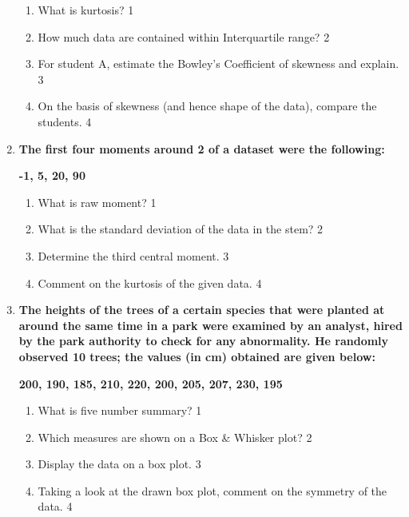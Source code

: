 \documentclass[a4paper,oneside]{book}
\begin{document}
\begin{enumerate}
  \begin{enumerate}
    \item
	What is kurtosis? \hfill 1
    \item
	How much data are contained within Interquartile range? \hfill 2
    \item  
	For student A, estimate the Bowley's Coefficient of skewness and explain. \hfill 3
    \item
	On the basis of skewness (and hence shape of the data), compare the students. \hfill 4
  \end{enumerate}
  
   \item
	  \textbf{The first four moments around 2 of a dataset were the following:}
	  
	  \begin{center}
	  \textbf{-1, 5, 20, 90}
	  \end{center}
  
  \begin{enumerate}
    \item
	What is raw moment? \hfill 1
    \item
	What is the standard deviation of the data in the stem? \hfill 2
    \item  
	Determine the third central moment. \hfill 3
    \item
	Comment on the kurtosis of the given data. \hfill 4
  \end{enumerate}
  
     \item
	  \textbf{The heights of the trees of a certain species that were planted at around the same time in a park were examined by an analyst, hired by the park authority to check for any abnormality. He randomly observed 10 trees; the values (in cm) obtained are given below:} 
	  
	  	  \begin{center}
	  \textbf{200, 190, 185, 210, 220, 200, 205, 207, 230, 195}
	  \end{center}
  
  \begin{enumerate}
    \item
	What is five number summary? \hfill 1
    \item
	Which measures are shown on a Box \& Whisker plot? \hfill 2
    \item  
	Display the data on a box plot. \hfill 3
    \item
	Taking a look at the drawn box plot, comment on the symmetry of the data. \hfill 4
  \end{enumerate}
  

\end{enumerate}
\end{document}
